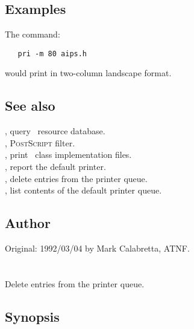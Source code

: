 \subsection*{Examples}

The command:

\begin{verbatim}
   pri -m 80 aips.h
\end{verbatim}

\noindent
would print  in two-column landscape format.

\subsection*{See also}

, query \aipspp\ resource database.\\
, \textsc{PostScript} filter.\\
, print \aipspp\ class implementation files.\\
, report the default printer.\\
, delete entries from the printer queue.\\
, list contents of the default printer queue.

\subsection*{Author}

Original: 1992/03/04 by Mark Calabretta, ATNF.


\newpage
\section{}
\label{prm}



Delete entries from the printer queue.

\subsection*{Synopsis}

\begin{synopsis}
\end{synopsis}

